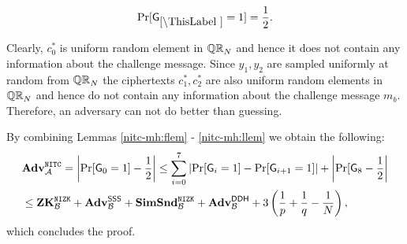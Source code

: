 %







%
%
%



\begin{lemma}\label{nitc-mh:llem}
\[
\Pr[\games_\thisgame = 1] = \half.
\]
\end{lemma}

Clearly, $c_0^*$ is uniform random element in $\mathbb{QR}_N$ and hence it does not contain any information about the challenge message. Since $y_1, y_2$ are sampled uniformly at random from $\mathbb{QR}_N$ the ciphertexts $c_1^*, c_2^*$ are also uniform random elements in $\mathbb{QR}_N$ and hence do not contain any information about the challenge message $m_b$. Therefore, an adversary can not do better than guessing.

By combining Lemmas \ref{nitc-mh:flem} - \ref{nitc-mh:llem} we obtain the following:
\begin{align*}
&\mathbf{Adv}^{\mathtt{NITC}}_{\mathcal{A}} = \left| \Pr[\mathsf{G}_0 = 1] - \frac{1}{2} \right| \leq \sum_{i=0}^7 \left|\Pr[\mathsf{G}_i = 1] - \Pr[\mathsf{G}_{i+1} = 1] \right| + \left|\Pr[\mathsf{G}_{8}- \frac{1}{2}\right| \\
 &\leq \mathbf{ZK}^{\mathtt{NIZK}}_{\mathcal{B}} + \mathbf{Adv}^{\mathsf{SSS}}_{\mathcal{B}} + \mathbf{SimSnd}^{\mathtt{NIZK}}_{\mathcal{B}} + \mathbf{Adv}^{\mathsf{DDH}}_{\mathcal{B}} + 3 \left( \frac{1}{p}+\frac{1}{q}-\frac{1}{N} \right),
\end{align*}
which concludes the proof.

